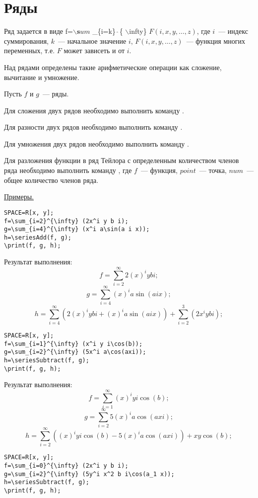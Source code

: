 \chapter{ Ряды}

Ряд задается в виде f=$\backslash {\mathbf sum}$ \_\{i=k\} $\widehat{\ }{}$\{ $\backslash$infty\} $F(i, x, y,\ldots, z)$,  где $i$~--- индекс суммирования,  $k$~--- начальное значение $i$,  $F(i, x, y,\ldots, z)$~--- функция многих переменных, т.е.  $F$ может зависеть и от $i$. 

Над рядами определены такие арифметические операции как сложение, вычитание и умножение.

Пусть $f$ и $g$~--- ряды.  

Для сложения двух рядов необходимо выполнить команду 
 . 

Для разности двух рядов необходимо выполнить команду
. 

Для умножения двух рядов необходимо выполнить команду
 . 

Для разложения функции в ряд Тейлора с определенным
количеством членов ряда необходимо выполнить команду ,  где
$f$~--- функция,  $point$~--- точка,  $num$~--- общее количество членов ряда. 

\underline{Примеры. }

\vspace*{-2mm}
\begin{verbatim}
SPACE=R[x, y];
f=\sum_{i=2}^{\infty} (2x^i y b i);
g=\sum_{i=4}^{\infty} (x^i a\sin(a i x));
h=\seriesAdd(f, g); 
\print(f, g, h);
\end{verbatim}

Результат выполнения:\\
$$f = \sum_{i=2}^{\infty} 2(x)^iybi;$$
$$g = \sum_{i=4}^{\infty} (x)^ia\sin(aix);$$
$$h = \sum_{i=4}^{\infty} (2(x)^iybi+(x)^ia\sin(aix))+\sum_{i=2}^{3}(2x^iybi);$$

\begin{verbatim}
SPACE=R[x, y];
f=\sum_{i=1}^{\infty} (x^i y i\cos(b));
g=\sum_{i=2}^{\infty} (5x^i a\cos(axi));
h=\seriesSubtract(f, g); 
\print(f, g, h);
\end{verbatim}

Результат выполнения:\\
$$f = \sum_{i=1}^{\infty} (x)^iyi\cos(b);$$
$$g = \sum_{i=2}^{\infty} 5(x)^ia\cos(axi);$$
$$h = \sum_{i=2}^{\infty} ((x)^iyi\cos(b)-5(x)^ia\cos(axi))+xy\cos(b);$$
\begin{verbatim}
SPACE=R[x, y];
f=\sum_{i=0}^{\infty} (2x^i y b i);
g=\sum_{i=2}^{\infty} (5y^i x^2 b i\cos(a_1 x));
h=\seriesSubtract(f, g); 
\print(f, g, h);
\end{verbatim}

